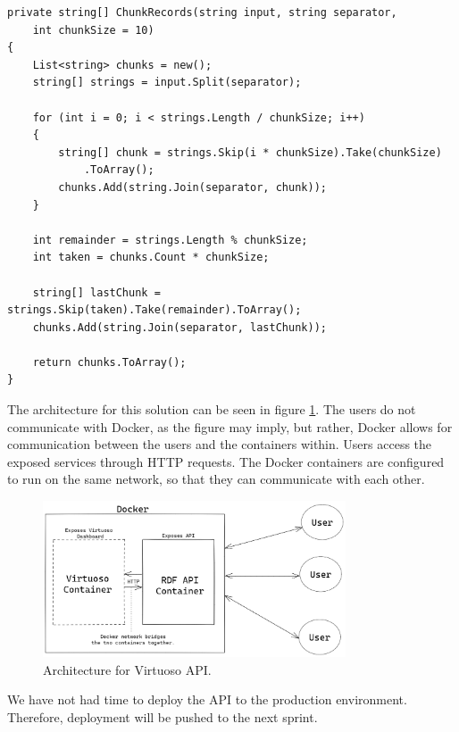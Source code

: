 \begin{lstlisting}[language=CSharp, caption={Chunking logic for large queries.}, label={lst:virtuoso_chunking}]
private string[] ChunkRecords(string input, string separator, 
    int chunkSize = 10)
{
    List<string> chunks = new();
    string[] strings = input.Split(separator);
    
    for (int i = 0; i < strings.Length / chunkSize; i++)
    {
        string[] chunk = strings.Skip(i * chunkSize).Take(chunkSize)
            .ToArray();
        chunks.Add(string.Join(separator, chunk));
    }

    int remainder = strings.Length % chunkSize;
    int taken = chunks.Count * chunkSize;

    string[] lastChunk = strings.Skip(taken).Take(remainder).ToArray();
    chunks.Add(string.Join(separator, lastChunk));
    
    return chunks.ToArray();
}
\end{lstlisting}


The architecture for this solution can be seen in figure \ref{fig:virtuoso_architecture}. The users do not communicate with Docker, as the figure may imply, but rather, Docker allows for communication between the users and the containers within. Users access the exposed services through HTTP requests. The Docker containers are configured to run on the same network, so that they can communicate with each other.

\begin{figure}[h!]
\centering
\includegraphics[width=0.8\textwidth]{Images/Virtuoso_Architecture.png}
\caption{Architecture for Virtuoso API.}
\label{fig:virtuoso_architecture}
\end{figure}

We have not had time to deploy the API to the production environment. Therefore, deployment will be pushed to the next sprint.